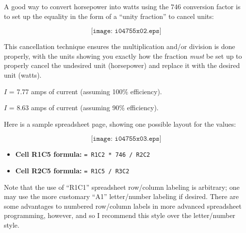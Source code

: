 





A good way to convert horsepower into watts using the 746 conversion factor is to set up the equality in the form of a ``unity fraction'' to cancel units:

$$\texttt{[image: i04755x02.eps]}$$

This cancellation technique ensures the multiplication and/or division is done properly, with the units showing you exactly how the fraction {\it must} be set up to properly cancel the undesired unit (horsepower) and replace it with the desired unit (watts).

\vskip 10pt

$I$ = 7.77 amps of current (assuming 100\% efficiency).

\vskip 10pt

$I$ = 8.63 amps of current (assuming 90\% efficiency).

\vskip 30pt

Here is a sample spreadsheet page, showing one possible layout for the values:

$$\texttt{[image: i04755x03.eps]}$$

\begin{itemize}
\item{} {\bf Cell R1C5 formula:} {\tt = R1C2 * 746 / R2C2}
\item{} {\bf Cell R2C5 formula:} {\tt = R1C5 / R3C2}
\end{itemize}

Note that the use of ``R1C1'' spreadsheet row/column labeling is arbitrary; one may use the more customary ``A1'' letter/number labeling if desired.  There are some advantages to numbered row/column labels in more advanced spreadsheet programming, however, and so I recommend this style over the letter/number style.










